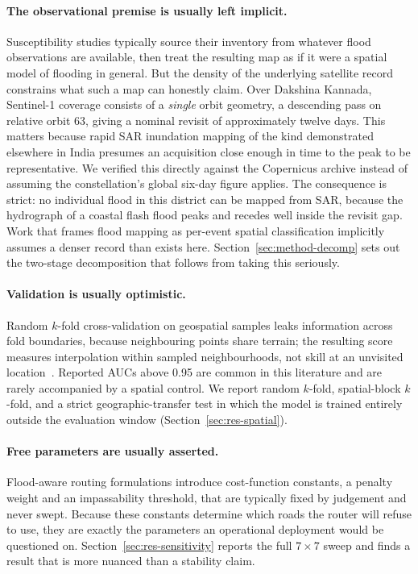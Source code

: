 \documentclass[11pt,a4paper]{article}
\begin{document}
\paragraph{The observational premise is usually left implicit.}
Susceptibility studies typically source their inventory from whatever flood
observations are available, then treat the resulting map as if it were a spatial
model of flooding in general. But the density of the underlying satellite record
constrains what such a map can honestly claim. Over Dakshina Kannada, Sentinel-1
\citep{torres2012} coverage consists of a \emph{single} orbit geometry, a
descending pass on relative orbit 63, giving a nominal revisit of approximately
twelve days. This matters because rapid SAR inundation mapping of the kind
demonstrated elsewhere in India \citep{arora2023} presumes an acquisition close
enough in time to the peak to be representative. We
verified this directly against the Copernicus archive instead of assuming the
constellation's global six-day figure applies. The consequence is strict: no
individual flood in this district can be mapped from SAR, because the hydrograph
of a coastal flash flood peaks and recedes well inside the revisit gap. Work that
frames flood mapping as per-event spatial classification implicitly assumes a
denser record than exists here. Section~\ref{sec:method-decomp} sets out the
two-stage decomposition that follows from taking this seriously.

\paragraph{Validation is usually optimistic.}
Random $k$-fold cross-validation on geospatial samples leaks information across
fold boundaries, because neighbouring points share terrain; the resulting score
measures interpolation within sampled neighbourhoods, not skill at an
unvisited location~\citep{roberts2017,ploton2020,meyer2021}. Reported AUCs above
0.95 are common in this literature and are rarely accompanied by a spatial
control. We report random $k$-fold, spatial-block $k$-fold, and a strict
geographic-transfer test in which the model is trained entirely outside the
evaluation window (Section~\ref{sec:res-spatial}).

\paragraph{Free parameters are usually asserted.}
Flood-aware routing formulations introduce cost-function constants, a penalty
weight and an impassability threshold, that are typically fixed by judgement and
never swept. Because these constants determine which roads the router will refuse
to use, they are exactly the parameters an operational deployment would be
questioned on. Section~\ref{sec:res-sensitivity} reports the full
$7\times7$ sweep and finds a result that is more nuanced than a stability claim.
\end{document}
